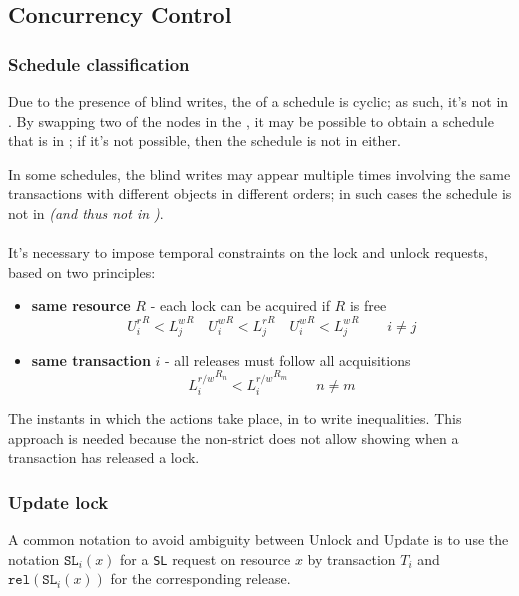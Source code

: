 \documentclass[english]{article}
\begin{document}
\subsection{Concurrency Control}

\subsubsection{Schedule classification}

Due to the presence of blind writes, the \CG of a schedule is cyclic;
as such, it's not in \CSR.
By swapping two of the nodes in the \CG, it may be possible to obtain a schedule that is in \VSR;
if it's not possible, then the schedule is not in \VSR either.

In some schedules, the blind writes may appear multiple times involving the same transactions with different objects in different orders;
in such cases the schedule is not in \CSR \textit{(and thus not in \VSR)}.

\paragraph{\TPL}

It's necessary to impose temporal constraints on the lock and unlock requests, based on two principles:

\begin{itemize}
  \item \textbf{same resource} \(R\) - each lock can be acquired if \(R\) is free
        \[ {U^r_i}^R < {L^w_j}^R \quad {U^w_i}^R < {L^r_j}^R \quad {U^w_i}^R < {L^w_j}^R \qquad i \neq j \]
  \item \textbf{same transaction} \(i\) - all releases must follow all acquisitions
        \[{L^{r/w}_i}^{R_n} < {L^{r/w}_i}^{R_m} \qquad n \neq m \]
\end{itemize}

The instants in which the actions take place, in to write inequalities.
This approach is needed because the non-strict \TPL does not allow showing when a transaction has released a lock.

\subsubsection{Update lock}

A common notation to avoid ambiguity between Unlock and Update is to use the notation \(\texttt{SL}_i(x)\) for a \texttt{SL} request on resource \(x\) by transaction \(T_i\) and \(\texttt{rel}(\texttt{SL}_i(x))\) for the corresponding release.
\end{document}
